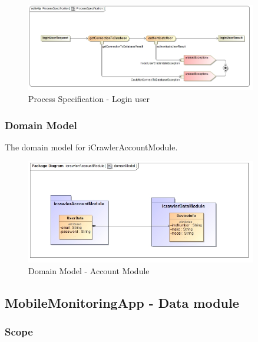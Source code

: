 \documentclass[hidelinks, 12pt, oneside]{article}
\begin{document}
		
		\begin{figure}[!htbp]
    		\centering
    		\includegraphics[width=0.9\textwidth]{img/processSpecificationLoginUser.jpg}
    		\caption{Process Specification - Login user}
    		\label{fig:ProcessSpec_loginUser}
		\end{figure}
		\newpage
		
		\subsubsection{Domain Model}
		The domain model for iCrawlerAccountModule.
		
		
		\begin{figure}[!htbp]
    		\centering
    		\includegraphics[width=0.9\textwidth]{img/DomainModelAccountModule.jpg}
    		\caption{Domain Model - Account Module}
    		\label{fig:DomainMod_accountModule}
		\end{figure}
	
	\newpage	
	\subsection{MobileMonitoringApp - Data module}
	\subsubsection{Scope}
	
\end{document}

